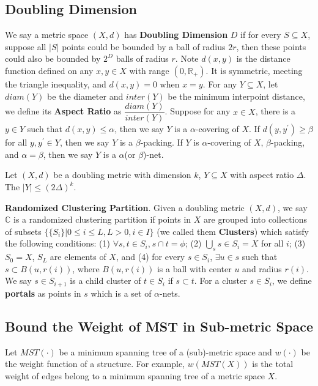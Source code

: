 \documentclass{llncs}
\begin{document}
\subsection{Doubling Dimension}
We say a metric space $(X,d)$ has \textbf{Doubling Dimension} $D$ if for every $S\subseteq X$, suppose all $|S|$ points could be bounded by a ball of radius $2r$, then these points could also be bounded by $2^D$ balls of radius $r$.
Note $d(x,y)$ is the distance function defined on any $x,y\in X$ with range $(0, {\mathbb{R}}_{+})$. It is symmetric, meeting the triangle inequality, and $d(x,y)=0$ when $x=y$.
For any $Y\subseteq X$, let $diam(Y)$ be the diameter and $inter(Y)$ be the minimum interpoint distance, we define its \textbf{Aspect Ratio} as $\dfrac{diam(Y)}{inter(Y)}$.
Suppose for any $x\in X$, there is a $y\in Y$ such that $d(x,y)\leq\alpha$, then we say $Y$ is a $\alpha$-covering of $X$.
If $d(y,y^\prime)\geq\beta$ for all $y,y^\prime\in Y$, then we say $Y$ is a $\beta$-packing. 
If $Y$ is $\alpha$-covering of $X$, $\beta$-packing, and $\alpha=\beta$, then we say $Y$ is a $\alpha$(or $\beta$)-net.\newline

\begin{lemma}
Let $(X,d)$ be a doubling metric with dimension $k$, $Y\subseteq X$ with aspect ratio $\Delta$.
The $|Y|\leq (2\Delta)^k$.
\end{lemma}

\noindent\textbf{Randomized Clustering Partition}. Given a doubling metric $(X,d)$, we say $\mathbb{C}$ is a randomized clustering partition if points in $X$ are grouped into collections of subsets $\{\{S_i\}|0\leq i\leq L, L > 0, i\in I\}$ (we called them \textbf{Clusters}) which satisfy the following conditions: (1) $\forall s,t\in S_i$,$~s\cap t=\phi$; (2) $\bigcup_s s\in S_i = X$ for all $i$; (3) $S_0 = X$, $S_L$ are elements of $X$, and (4) for every $s\in S_i$, $\exists u\in s$ such that $s\subset B(u,r(i))$, where $B(u,r(i))$ is a ball with center $u$ and radius $r(i)$.
We say $s\in S_{i+1}$ is a child cluster of $t\in S_i$ if $s\subset t$.
For a cluster $s\in S_i$, we define \textbf{portals} as points in $s$ which is a set of $\alpha$-nets.



\subsection{Bound the Weight of MST in Sub-metric Space}

Let $MST(\cdot)$ be a minimum spanning tree of a (sub)-metric space and $w(\cdot)$ be the weight function of a structure.
For example, $w(MST(X))$ is the total weight of edges belong to a minimum spanning tree of a metric space $X$.
\end{document}
